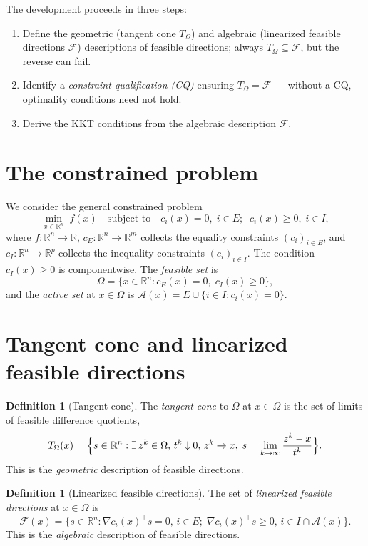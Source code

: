 \documentclass[11pt,a4paper]{report}
\theoremstyle{plain}
\theoremstyle{definition}
\newtheorem{definition}[theorem]{Definition}
\newcommand{\R}{\mathbb{R}}
\newcommand{\grad}{\nabla}
\newcommand{\trans}{^{\top}}
\begin{document}
The development proceeds in three steps:
\begin{enumerate}[leftmargin=2em,itemsep=0pt]
  \item Define the geometric (tangent cone $T_{\Omega}$) and algebraic
        (linearized feasible directions $\mathcal{F}$) descriptions of feasible
        directions; always $T_{\Omega}\subseteq\mathcal{F}$, but the reverse
        can fail.
  \item Identify a \emph{constraint qualification (CQ)} ensuring
        $T_{\Omega}=\mathcal{F}$ — without a CQ, optimality conditions need
        not hold.
  \item Derive the KKT conditions from the algebraic description $\mathcal{F}$.
\end{enumerate}

\section{The constrained problem}

We consider the general constrained problem
\begin{equation}\label{eq:CP}\tag{CP}
\min_{x\in\R^{n}}\; f(x)\quad\text{subject to}\quad
c_{i}(x)=0,\;i\in E;\;\;c_{i}(x)\ge 0,\;i\in I,
\end{equation}
where $f:\R^{n}\to\R$, $c_{E}:\R^{n}\to\R^{m}$ collects the equality
constraints $(c_{i})_{i\in E}$, and $c_{I}:\R^{n}\to\R^{p}$ collects the
inequality constraints $(c_{i})_{i\in I}$. The condition $c_{I}(x)\ge 0$ is
componentwise. The \emph{feasible set} is
\[
\Omega=\{x\in\R^{n}:c_{E}(x)=0,\;c_{I}(x)\ge 0\},
\]
and the \emph{active set} at $x\in\Omega$ is
$\mathcal{A}(x)=E\cup\{i\in I:c_{i}(x)=0\}$.

\section{Tangent cone and linearized feasible directions}

\begin{definition}[Tangent cone]
The \emph{tangent cone} to $\Omega$ at $x\in\Omega$ is the set of limits of
feasible difference quotients,
\[
T_{\Omega}(x)=\Bigl\{s\in\R^{n}:\exists\,z^{k}\in\Omega,\,t^{k}\downarrow 0,\,
z^{k}\to x,\;s=\lim_{k\to\infty}\frac{z^{k}-x}{t^{k}}\Bigr\}.
\]
This is the \emph{geometric} description of feasible directions.
\end{definition}

\begin{definition}[Linearized feasible directions]
The set of \emph{linearized feasible directions} at $x\in\Omega$ is
\[
\mathcal{F}(x)=\bigl\{s\in\R^{n}:\grad c_{i}(x)\trans s=0,\,i\in E;\;
\grad c_{i}(x)\trans s\ge 0,\,i\in I\cap\mathcal{A}(x)\bigr\}.
\]
This is the \emph{algebraic} description of feasible directions.
\end{definition}
\end{document}
